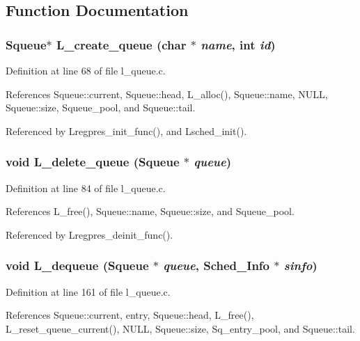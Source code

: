 \subsection{Function Documentation}
\subsubsection{\setlength{\rightskip}{0pt plus 5cm}\bf{Squeue}$\ast$ L\_\-create\_\-queue (char $\ast$ {\em name}, int {\em id})}\label{l__queue_8c_43403c4293b8d84da6b0cd6944543310}




Definition at line 68 of file l\_\-queue.c.

References Squeue::current, Squeue::head, L\_\-alloc(), Squeue::name, NULL, Squeue::size, Squeue\_\-pool, and Squeue::tail.

Referenced by Lregpres\_\-init\_\-func(), and Lsched\_\-init().
\subsubsection{\setlength{\rightskip}{0pt plus 5cm}void L\_\-delete\_\-queue (\bf{Squeue} $\ast$ {\em queue})}\label{l__queue_8c_bbbeef78440f0b1f5dcef84469fda654}




Definition at line 84 of file l\_\-queue.c.

References L\_\-free(), Squeue::name, Squeue::size, and Squeue\_\-pool.

Referenced by Lregpres\_\-deinit\_\-func().
\subsubsection{\setlength{\rightskip}{0pt plus 5cm}void L\_\-dequeue (\bf{Squeue} $\ast$ {\em queue}, \bf{Sched\_\-Info} $\ast$ {\em sinfo})}\label{l__queue_8c_ab29b10359f2002adc92857394cbb1ff}




Definition at line 161 of file l\_\-queue.c.

References Squeue::current, entry, Squeue::head, L\_\-free(), L\_\-reset\_\-queue\_\-current(), NULL, Squeue::size, Sq\_\-entry\_\-pool, and Squeue::tail.

